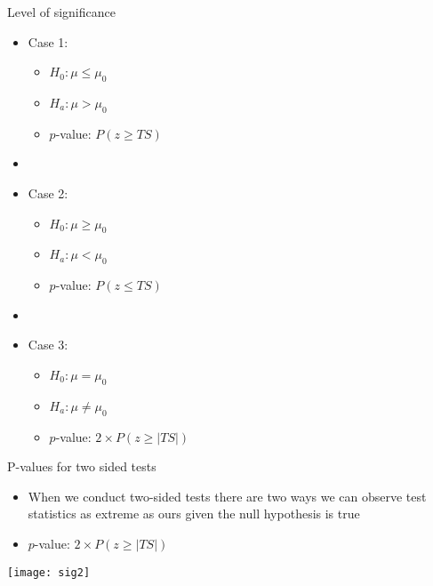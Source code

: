 \documentclass[xcolor=dvipsnames]{beamer}
\begin{document}
\begin{frame}{Level of significance}
	\begin{itemize}
		\item Case 1:
		\begin{itemize}
			\item $H_0: \mu \leq \mu_0$
			\item $H_a: \mu > \mu_0$
			\item $p$-value: $P(z \geq TS)$
		\end{itemize}
		\item[]
		\item Case 2:
		\begin{itemize}
			\item $H_0: \mu \geq \mu_0$
			\item $H_a: \mu < \mu_0$
			\item $p$-value: $P(z \leq TS)$
		\end{itemize}
		\item[]
		\item Case 3:
		\begin{itemize}
			\item $H_0: \mu = \mu_0$
			\item $H_a: \mu \neq \mu_0$
			\item $p$-value: $2\times P(z \geq |TS|)$ 
		\end{itemize}
	\end{itemize}
\end{frame}

\begin{frame}{P-values for two sided tests}
\begin{itemize}
	\item When we conduct two-sided tests there are two ways we can observe test statistics as extreme as ours given the null hypothesis is true
	\item $p$-value: $2\times P(z \geq |TS|)$ 
\end{itemize}
\vspace{-8 pt}
\begin{center}
	\texttt{[image: sig2]}
\end{center}
\end{frame}
\end{document}
